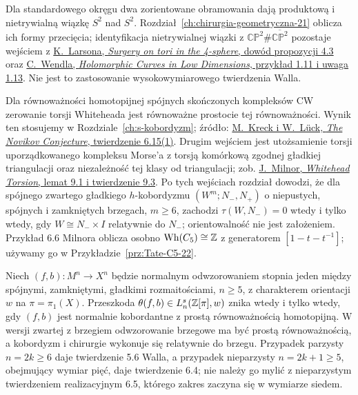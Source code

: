 \begin{description}[leftmargin=2.9cm,style=nextline]
\item[Dwie chirurgii okręgu w $S^4$.]
  Dla standardowego okręgu dwa zorientowane obramowania
  dają produktową i nietrywialną wiązkę $S^2$ nad $S^2$.
  Rozdział~\ref{ch:chirurgia-geometryczna-21} oblicza ich formy
  przecięcia; identyfikacja nietrywialnej wiązki z
  $\mathbb{CP}^2\#\overline{\mathbb{CP}^2}$ pozostaje wejściem z
  \href{https://arxiv.org/abs/1502.06834}
  {K.\ Larsona, \emph{Surgery on tori in the 4-sphere},
  dowód propozycji 4.3} oraz
  \href{https://www.mathematik.hu-berlin.de/~wendl/pub/rationalRuled.pdf}
  {C.\ Wendla, \emph{Holomorphic Curves in Low Dimensions},
  przykład 1.11 i uwaga 1.13}.
  Nie jest to zastosowanie wysokowymiarowego
  twierdzenia Walla.

\item[Torsja Whiteheada i $s$-kobordyzm.]
  Dla równoważności homotopijnej spójnych skończonych
  kompleksów CW zerowanie torsji Whiteheada jest równoważne
  prostocie tej równoważności. Wynik ten stosujemy w
  Rozdziale~\ref{ch:s-kobordyzm}; źródło:
  \href{https://webhomes.maths.ed.ac.uk/~v1ranick/papers/owsem.pdf}
  {M.\ Kreck i W.\ Lück, \emph{The Novikov Conjecture},
  twierdzenie 6.15(1)}. Drugim wejściem jest utożsamienie
  torsji uporządkowanego kompleksu Morse'a z torsją
  komórkową zgodnej gładkiej triangulacji oraz niezależność
  tej klasy od triangulacji; zob.
  \href{https://webhomes.maths.ed.ac.uk/~v1ranick/papers/milnorwh.pdf}
  {J.\ Milnor, \emph{Whitehead Torsion}, lemat 9.1
  i twierdzenie 9.3}. Po tych wejściach rozdział dowodzi,
  że dla spójnego zwartego gładkiego $h$-kobordyzmu
  $(W^m;N_-,N_+)$ o niepustych, spójnych i zamkniętych
  brzegach, $m\geq6$, zachodzi
  $\tau(W,N_-)=0$ wtedy i tylko wtedy, gdy
  $W\cong N_-\times I$ relatywnie do $N_-$;
  orientowalność nie jest założeniem.
  Przykład 6.6 Milnora oblicza osobno
  $\operatorname{Wh}(C_5)\cong\mathbb{Z}$ z generatorem
  $[1-t-t^{-1}]$; używamy go w
  Przykładzie~\ref{prz:Tate-C5-22}.

\item[Twierdzenia Walla.]
  Niech $(f,b):M^n\to X^n$ będzie normalnym
  odwzorowaniem stopnia jeden między spójnymi,
  zamkniętymi, gładkimi rozmaitościami, $n\geq5$,
  z charakterem orientacji $w$ na
  $\pi=\pi_1(X)$. Przeszkoda
  $\theta(f,b)\in L_n^s(\mathbb{Z}[\pi],w)$ znika wtedy
  i tylko wtedy, gdy $(f,b)$ jest normalnie
  kobordantne z prostą równoważnością homotopijną.
  W wersji zwartej z brzegiem odwzorowanie brzegowe
  ma być prostą równoważnością, a kobordyzm i chirurgie
  wykonuje się relatywnie do brzegu. Przypadek parzysty
  $n=2k\geq6$ daje twierdzenie 5.6 Walla, a przypadek
  nieparzysty $n=2k+1\geq5$, obejmujący wymiar pięć,
  daje twierdzenie 6.4; nie należy go mylić z nieparzystym
  twierdzeniem realizacyjnym 6.5, którego zakres zaczyna
  się w wymiarze siedem.


\end{description}
